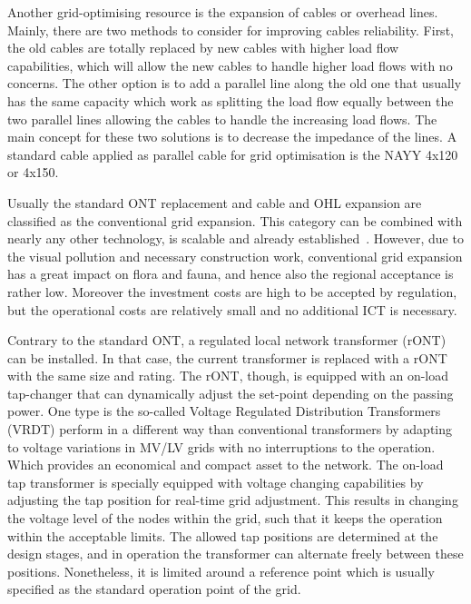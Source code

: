 
Another grid-optimising resource is the expansion of cables or overhead lines. Mainly, there are two methods to consider for improving cables reliability. First, the old cables are totally replaced by new cables with higher load flow capabilities, which will allow the new cables to handle higher load flows with no concerns. The other option is to add a parallel line along the old one that usually has the same capacity which work as splitting the load flow equally between the two parallel lines allowing the cables to handle the increasing load flows. The main concept for these two solutions is to decrease the impedance of the lines. A standard cable applied as parallel cable for grid optimisation is the NAYY 4x120 or 4x150.~\cite{amprion_underground_2017,mona}

Usually the standard ONT replacement and cable and OHL expansion are classified as the conventional grid expansion. This category can be combined with nearly any other technology, is scalable and already established~\cite{monamaßnahmen}. However, due to the visual pollution and necessary construction work, conventional grid expansion has a great impact on flora and fauna, and hence also the regional acceptance is rather low. Moreover the investment costs are high to be accepted by regulation, but the operational costs are relatively small and no additional ICT is necessary.

Contrary to the standard ONT, a regulated local network transformer (rONT) can be installed. In that case, the current transformer is replaced with a rONT with the same size and rating. The rONT, though, is equipped with an on-load tap-changer that can dynamically adjust the set-point depending on the passing power. One type is the so-called Voltage Regulated Distribution Transformers (VRDT) perform in a different way than conventional transformers by adapting to voltage variations in MV/LV grids with no interruptions to the operation. Which provides an economical and compact asset to the network. The on-load tap transformer is specially equipped with voltage changing capabilities by adjusting the tap position for real-time grid adjustment. This results in changing the voltage level of the nodes within the grid, such that it keeps the operation within the acceptable limits. The allowed tap positions are determined at the design stages, and in operation the transformer can alternate freely between these positions. Nonetheless, it is limited around a reference point which is usually specified as the standard operation point of the grid.~\cite{9543749,sojer_voltage_2017}

